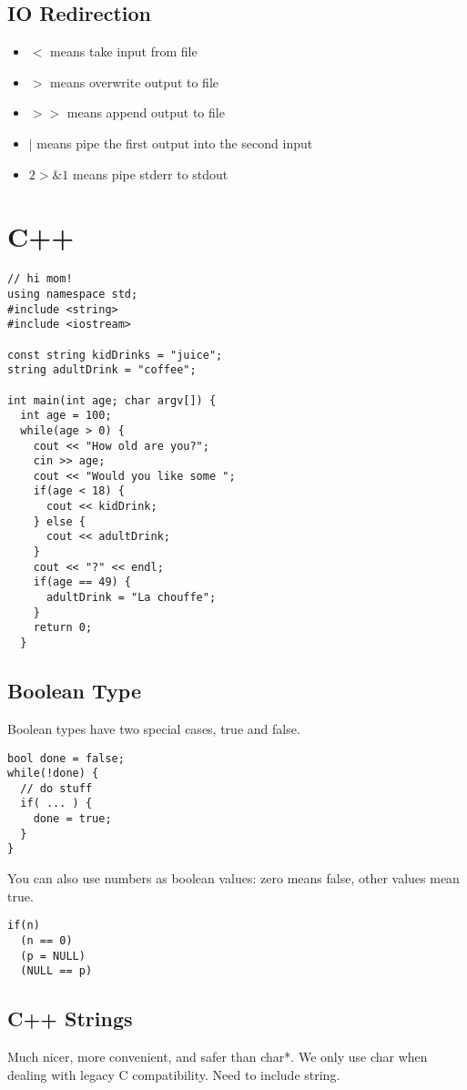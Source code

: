 \documentclass[12pt]{article}
\begin{document}
\subsection*{IO Redirection}
\begin{itemize}
\item $<$ means take input from file
\item $>$ means overwrite output to file
\item $>>$ means append output to file
\item $|$ means pipe the first output into the second input
\item $2>\&1$ means pipe stderr to stdout
\end{itemize}

\section*{C++}
\begin{verbatim}
// hi mom!
using namespace std;
#include <string>
#include <iostream>

const string kidDrinks = "juice";
string adultDrink = "coffee";

int main(int age; char argv[]) {
  int age = 100;
  while(age > 0) {
    cout << "How old are you?";
    cin >> age;
    cout << "Would you like some ";
    if(age < 18) {
      cout << kidDrink;
    } else {
      cout << adultDrink;
    }
    cout << "?" << endl;
    if(age == 49) {
      adultDrink = "La chouffe";
    }
    return 0;
  }
\end{verbatim}

\subsection*{Boolean Type}
Boolean types have two special cases, true and false.

\begin{verbatim}
bool done = false;
while(!done) {
  // do stuff
  if( ... ) {
    done = true;
  }
}
\end{verbatim}

You can also use numbers as boolean values: zero means false, other values mean true.
\begin{verbatim}
if(n)
  (n == 0)
  (p = NULL)
  (NULL == p)
\end{verbatim}

\subsection*{C++ Strings}
Much nicer, more convenient, and safer than char*. We only use char when dealing with legacy C compatibility. Need to include string.
\end{document}
